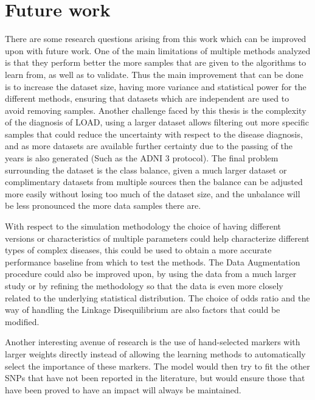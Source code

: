 \section{Future work} \label{section_future_work}

There are some research questions arising from this work which can be improved upon with future work. One of the main limitations of multiple methods analyzed is that they perform better the more samples that are given to the algorithms to learn from, as well as to validate. Thus the main improvement that can be done is to increase the dataset size, having more variance and statistical power for the different methods, ensuring that datasets which are independent are used to avoid removing samples. Another challenge faced by this thesis is the complexity of the diagnosis of LOAD, using a larger dataset allows filtering out more specific samples that could reduce the uncertainty with respect to the disease diagnosis, and as more datasets are available further certainty due to the passing of the years is also generated (Such as the ADNI 3 protocol). The final problem surrounding the dataset is the class balance, given a much larger dataset or complimentary datasets from multiple sources then the balance can be adjusted more easily without losing too much of the dataset size, and the unbalance will be less pronounced the more data samples there are.

With respect to the simulation methodology the choice of having different versions or characteristics of multiple parameters could help characterize different types of complex diseases, this could be used to obtain a more accurate performance baseline from which to test the methods. The Data Augmentation procedure could also be improved upon, by using the data from a much larger study or by refining the methodology so that the data is even more closely related to the underlying statistical distribution. The choice of odds ratio and the way of handling the Linkage Disequilibrium are also factors that could be modified.

Another interesting avenue of research is the use of hand-selected markers with larger weights directly instead of allowing the learning methods to automatically select the importance of these markers. The model would then try to fit the other SNPs that have not been reported in the literature, but would ensure those that have been proved to have an impact will always be maintained.

